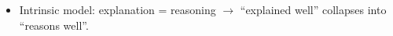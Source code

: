 \begin{itemize}
    \item Intrinsic model: explanation = reasoning $\to$ ``explained well'' collapses into ``reasons well''. 

\end{itemize}
